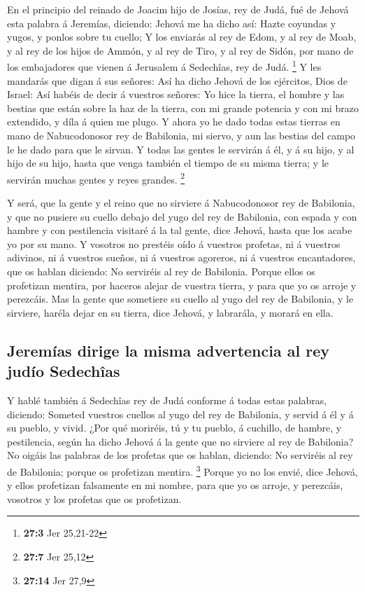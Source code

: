  En el principio del reinado de Joacim hijo de Josías, rey
de Judá, fué de Jehová esta palabra á Jeremías, diciendo: 
Jehová me ha dicho así: Hazte coyundas y yugos, y ponlos sobre tu
cuello;  Y los enviarás al rey de Edom, y al rey de Moab, y
al rey de los hijos de Ammón, y al rey de Tiro, y al rey de Sidón, por
mano de los embajadores que vienen á Jerusalem á Sedechîas, rey de Judá.
\footnote{\textbf{27:3} Jer 25,21-22}  Y les mandarás que
digan á sus señores: Así ha dicho Jehová de los ejércitos, Dios de
Israel: Así habéis de decir á vuestros señores:  Yo hice la
tierra, el hombre y las bestias que están sobre la haz de la tierra, con
mi grande potencia y con mi brazo extendido, y díla á quien me plugo.
 Y ahora yo he dado todas estas tierras en mano de
Nabucodonosor rey de Babilonia, mi siervo, y aun las bestias del campo
le he dado para que le sirvan.  Y todas las gentes le
servirán á él, y á su hijo, y al hijo de su hijo, hasta que venga
también el tiempo de su misma tierra; y le servirán muchas gentes y
reyes grandes. \footnote{\textbf{27:7} Jer 25,12}

 Y será, que la gente y el reino que no sirviere á
Nabucodonosor rey de Babilonia, y que no pusiere su cuello debajo del
yugo del rey de Babilonia, con espada y con hambre y con pestilencia
visitaré á la tal gente, dice Jehová, hasta que los acabe yo por su
mano.  Y vosotros no prestéis oído á vuestros profetas, ni á
vuestros adivinos, ni á vuestros sueños, ni á vuestros agoreros, ni á
vuestros encantadores, que os hablan diciendo: No serviréis al rey de
Babilonia.  Porque ellos os profetizan mentira, por haceros
alejar de vuestra tierra, y para que yo os arroje y perezcáis.
 Mas la gente que sometiere su cuello al yugo del rey de
Babilonia, y le sirviere, haréla dejar en su tierra, dice Jehová, y
labrarála, y morará en ella.

\hypertarget{jeremuxedas-dirige-la-misma-advertencia-al-rey-juduxedo-sedechuxeeas}{%
\subsection{Jeremías dirige la misma advertencia al rey judío
Sedechîas}\label{jeremuxedas-dirige-la-misma-advertencia-al-rey-juduxedo-sedechuxeeas}}

 Y hablé también á Sedechîas rey de Judá conforme á todas
estas palabras, diciendo: Someted vuestros cuellos al yugo del rey de
Babilonia, y servid á él y á su pueblo, y vivid.  ¿Por qué
moriréis, tú y tu pueblo, á cuchillo, de hambre, y pestilencia, según ha
dicho Jehová á la gente que no sirviere al rey de Babilonia?
 No oigáis las palabras de los profetas que os hablan,
diciendo: No serviréis al rey de Babilonia; porque os profetizan
mentira. \footnote{\textbf{27:14} Jer 27,9}  Porque yo no
los envié, dice Jehová, y ellos profetizan falsamente en mi nombre, para
que yo os arroje, y perezcáis, vosotros y los profetas que os
profetizan.

